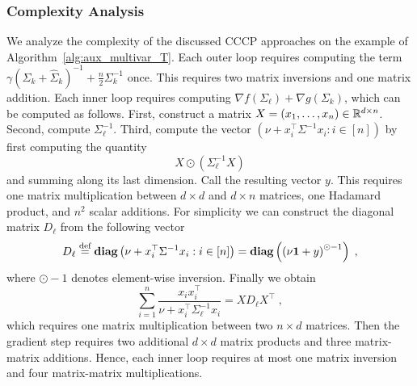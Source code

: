 \documentclass[sn-nature]{sn-jnl}%
\theoremstyle{thmstyleone}%
\theoremstyle{thmstyletwo}%
\theoremstyle{thmstylethree}%
\begin{document}



\subsubsection{Complexity Analysis}
We analyze the complexity of the discussed CCCP approaches on the example of Algorithm~\ref{alg:aux_multivar_T}. Each outer loop requires computing the term $\gamma \left(\Sigma_k + \hat{\Sigma}_k\right)^{-1} + \frac{n}{2}\Sigma_k^{-1}$ once. This requires two matrix inversions and one matrix addition. Each inner loop requires computing $\nabla f(\Sigma_\ell) + \nabla g(\Sigma_k)$, which can be computed as follows. First, construct a matrix $X = \left( x_1, \ldots, x_n \right) \in \mathbb{R}^{d \times n}$. Second, compute $\Sigma_\ell^{-1}.$ Third, compute the vector $(\nu + x_i^\top \Sigma^{-1}x_i : i \in [n])$ by first computing the quantity 
\[
X \odot \left( \Sigma_\ell^{-1} X \right)
\]
and summing along its last dimension. Call the resulting vector $y$. This requires one matrix multiplication between $d \times d$ and $d \times n$ matrices, one Hadamard product, and $n^2$ scalar additions. For simplicity we can construct the diagonal matrix $D_\ell$ from the following vector
\[
D_\ell \stackrel{\text{def}}{=} \textbf{diag}\left(\nu + x_i^\top \Sigma^{-1}x_i : i \in [n]\right) = \textbf{diag} \left(\left(\nu \mathbf{1} + y\right)^{\odot -1} \right) \; ,
\]
where $\odot -1$ denotes element-wise inversion. Finally we obtain 
\[
\sum_{i=1}^n \frac{x_i x_i^\top}{\nu + x_i^\top \Sigma_\ell^{-1} x_i}  = X D_\ell X^\top \; ,
\]
which requires one matrix multiplication between two $n \times d$ matrices.
Then the gradient step requires two additional $d \times d$ matrix products and three matrix-matrix additions. Hence, each inner loop requires at most one matrix inversion and four matrix-matrix multiplications. 
\end{document}
